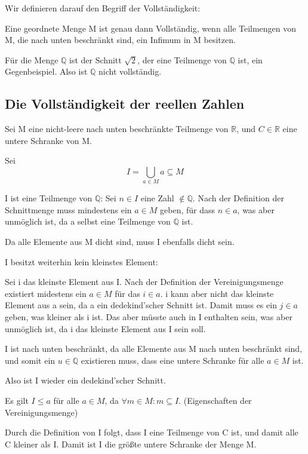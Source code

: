 \documentclass[12pt]{article}
\begin{document}
    Wir definieren darauf den Begriff der Vollständigkeit:

    Eine geordnete Menge M ist genau dann Vollständig, wenn alle Teilmengen von M, die nach unten beschränkt sind,
    ein Infimum in M besitzen.

    Für die Menge $\mathbb{Q}$ ist der Schnitt $\sqrt{2}$, der eine Teilmenge von $\mathbb{Q}$ ist, ein Gegenbeispiel.
    Also ist $\mathbb{Q}$ nicht vollständig.

    \subsection{Die Vollständigkeit der reellen Zahlen}

    Sei M eine nicht-leere nach unten beschränkte Teilmenge von $\mathbb{R}$, und $C \in \mathbb{R}$ eine untere Schranke von M.

    Sei
    \[I = \bigcup \limits_{a \in M} a \subseteq M\]

    I ist eine Teilmenge von $\mathbb{Q}$:
    Sei $n \in I$ eine Zahl $\not \in \mathbb{Q}$. Nach der Definition der Schnittmenge muss mindestens ein
    $a \in M$ geben, für dass $n \in a$, was aber unmöglich ist, da a selbst eine Teilmenge von $\mathbb{Q}$ ist.

    Da alle Elemente aus M dicht sind, muss I ebenfalls dicht sein.  %

    I besitzt weiterhin kein kleinstes Element:

    Sei i das kleinste Element aus I.
    Nach der Definition der Vereinigungsmenge existiert midestens ein $a \in M$ für das $i \in a$.
    i kann aber nicht das kleinste Element aus a sein, da a ein dedekind'scher Schnitt ist.
    Damit muss es ein $j \in a$ geben, was kleiner als i ist. Das aber müsste auch in I enthalten sein,
    was aber unmöglich ist, da i das kleinste Element aus I sein soll.

    I ist nach unten beschränkt, da alle Elemente aus M nach unten beschränkt sind, und somit ein
    $u \in \mathbb{Q}$ existieren muss, dass eine untere Schranke für alle $a \in M$ ist.

    Also ist I wieder ein dedekind'scher Schnitt.

    Es gilt $I \le a$ für alle $a \in M$, da $\forall m \in M: m \subseteq I$. (Eigenschaften der Vereinigungsmenge)

    Durch die Definition von I folgt, dass I eine Teilmenge von C ist, und damit alle C kleiner als I.
    Damit ist I die größte untere Schranke der Menge M.
\end{document}
